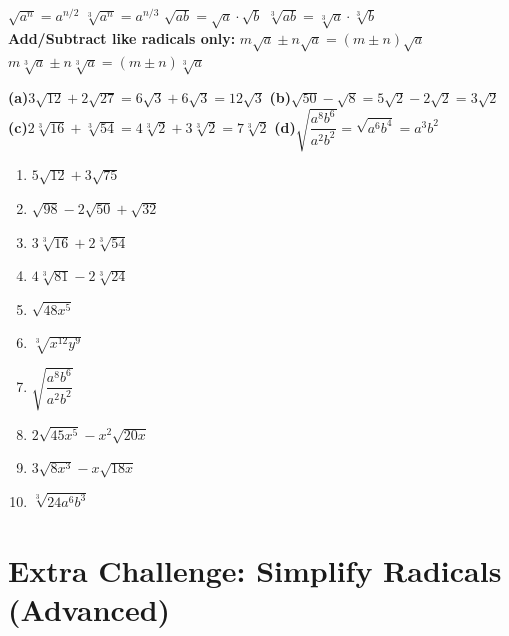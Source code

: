 \documentclass[11pt]{article}
\begin{document}
\begin{tcolorbox}[keybox,title={Key Rules}]
$\sqrt{a^n}=a^{n/2}$\quad
$\sqrt[3]{a^n}=a^{n/3}$\quad
$\sqrt{ab}=\sqrt{a}\cdot\sqrt{b}$\quad
$\sqrt[3]{ab}=\sqrt[3]{a}\cdot\sqrt[3]{b}$\\[4pt]
\textbf{Add/Subtract like radicals only:}\;
$m\sqrt{a}\pm n\sqrt{a}=(m\pm n)\sqrt{a}$\quad
$m\sqrt[3]{a}\pm n\sqrt[3]{a}=(m\pm n)\sqrt[3]{a}$
\end{tcolorbox}

\begin{tcolorbox}[exbox,title={Examples}]
\textbf{(a)}\;$3\sqrt{12}+2\sqrt{27}=6\sqrt{3}+6\sqrt{3}=\boxed{12\sqrt{3}}$\qquad
\textbf{(b)}\;$\sqrt{50}-\sqrt{8}=5\sqrt{2}-2\sqrt{2}=\boxed{3\sqrt{2}}$\\[5pt]
\textbf{(c)}\;$2\sqrt[3]{16}+\sqrt[3]{54}=4\sqrt[3]{2}+3\sqrt[3]{2}=\boxed{7\sqrt[3]{2}}$\qquad
\textbf{(d)}\;$\sqrt{\dfrac{a^8b^6}{a^2b^2}}=\sqrt{a^6b^4}=\boxed{a^3b^2}$
\end{tcolorbox}

\begin{enumerate}[leftmargin=*,label=\textbf{\arabic*.}]
\item $5\sqrt{12}+3\sqrt{75}$\vspace{2cm}
\item $\sqrt{98}-2\sqrt{50}+\sqrt{32}$\vspace{2cm}
\item $3\sqrt[3]{16}+2\sqrt[3]{54}$\vspace{2cm}
\item $4\sqrt[3]{81}-2\sqrt[3]{24}$\vspace{2cm}
\item $\sqrt{48x^5}$\vspace{2cm}
\item $\sqrt[3]{x^{12}y^9}$\vspace{2cm}
\item $\sqrt{\dfrac{a^8b^6}{a^2b^2}}$\vspace{2.2cm}
\item $2\sqrt{45x^5}-x^2\sqrt{20x}$\vspace{2cm}
\item $3\sqrt{8x^3}-x\sqrt{18x}$\vspace{2cm}
\item $\sqrt[3]{24a^6b^3}$\vspace{2cm}
\end{enumerate}

\newpage
\section{Extra Challenge: Simplify Radicals \textnormal{\small(Advanced)}}
\end{document}
